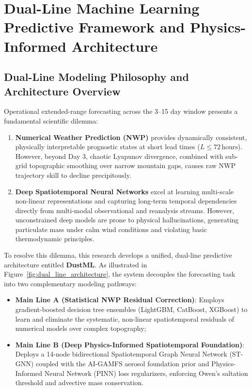 
\chapter{Dual-Line Machine Learning Predictive Framework and Physics-Informed Architecture}
\label{chap:methodology}

\section{Dual-Line Modeling Philosophy and Architecture Overview}
\label{sec:dual_line_philosophy}

Operational extended-range forecasting across the 3--15 day window presents a fundamental scientific dilemma:
\begin{enumerate}
    \item \textbf{Numerical Weather Prediction (NWP)} provides dynamically consistent, physically interpretable prognostic states at short lead times ($L \le 72\,\text{hours}$). However, beyond Day 3, chaotic Lyapunov divergence, combined with sub-grid topographic smoothing over narrow mountain gaps, causes raw NWP trajectory skill to decline precipitously.
    \item \textbf{Deep Spatiotemporal Neural Networks} excel at learning multi-scale non-linear representations and capturing long-term temporal dependencies directly from multi-modal observational and reanalysis streams. However, unconstrained deep models are prone to physical hallucinations, generating particulate mass under calm wind conditions and violating basic thermodynamic principles.
\end{enumerate}

To resolve this dilemma, this research develops a unified, dual-line predictive architecture entitled \textbf{DustML}. As illustrated in Figure~\ref{fig:dual_line_architecture}, the system decouples the forecasting task into two complementary modeling pathways:
\begin{itemize}
    \item \textbf{Main Line A (Statistical NWP Residual Correction)}: Employs gradient-boosted decision tree ensembles (LightGBM, CatBoost, XGBoost) to learn and eliminate the systematic, non-linear spatiotemporal residuals of numerical models over complex topography;
    \item \textbf{Main Line B (Deep Physics-Informed Spatiotemporal Foundation)}: Deploys a 14-node bidirectional Spatiotemporal Graph Neural Network (ST-GNN) coupled with the AI-GAMFS aerosol foundation prior and Physics-Informed Neural Network (PINN) loss regularizers, enforcing Owen's saltation threshold and advective mass conservation.
\end{itemize}

